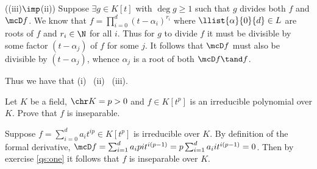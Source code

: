 \documentclass{article}
\begin{document}
\begin{solution}
((iii)\( \imp \)(ii)) Suppose \( \exists g\in K[t] \) with \( \deg g \geq 1 \) such that \( g \) divides both \( f \) and \( \mcD f \).
We know that \( f = \prod_{i=0}^{d}(t-\alpha_i)^{r_i} \) where \( \llist{\alpha}{0}{d} \in L \) are roots of \( f \) and \( r_i \in \N \) for all \( i \).
Thus for \( g \) to divide \( f \) it must be divisible by some factor \( (t-\alpha_j) \) of \( f \) for some \( j \).
It follows that \( \mcD f \) must also be divisible by \( (t-\alpha_j) \), whence \( \alpha_j \) is a root of both \( \mcD f \tand f \).

Thus we have that (i) \iff~(ii) \iff~(iii).
\end{solution}

\begin{exercise} %
  \label{qs:two}
Let \( K \) be a field, \( \chr K = p > 0 \) and \( f\in K[t^p] \) is an irreducible polynomial over \( K \).
Prove that \( f \) is inseparable.
\end{exercise}
\begin{solution}
  Suppose \( f = \sum_{i=0}^{d} a_i t^{ip} \in K[t^p] \) is irreducible over \( K \).
  By definition of the formal derivative, \( \mcD f = \sum_{i=1}^{d} a_i pi t^{i(p-1)} = p\sum_{i=1}^{d} a_i i t^{i(p-1)} = 0 \).
  Then by exercise \ref{qs:one} it follows that \( f \) is inseparable over \( K \).
\end{solution}
\end{document}
